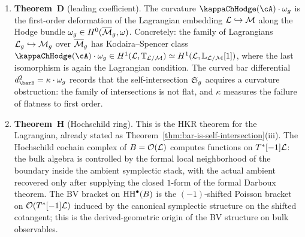 \begin{proposition}
\begin{enumerate}[label=\textup{(\Alph*)},leftmargin=2.2em]
\item \textbf{Theorem~D} \textup{(}leading coefficient\textup{)}.
 The curvature $\kappaChHodge(\cA) \cdot \omega_g$ is the first-order
 deformation of the Lagrangian embedding
 $\mathcal L \hookrightarrow \mathcal M$ along the Hodge bundle
 $\omega_g \in H^0(\overline{\mathcal M}_g, \omega)$. Concretely:
 the family of Lagrangians
 $\mathcal L_g \hookrightarrow \mathcal M_g$ over $\overline{\mathcal M}_g$ has
 Kodaira--Spencer class $\kappaChHodge(\cA) \cdot \omega_g
 \in H^1(\cL, \mathbb{T}_{\cL/\cM}) \simeq
 H^1(\cL, \mathbb{L}_{\cL/\cM}[1])$,
 where the last isomorphism is again the Lagrangian condition.
 The curved bar differential
 $d_{\barB}^2 = \kappa \cdot \omega_g$ records that the
 self-intersection $\mathfrak{S}_g$ acquires a curvature obstruction:
 the family of intersections is not flat, and $\kappa$ measures
 the failure of flatness to first order.

\item \textbf{Theorem~H} \textup{(}Hochschild ring\textup{)}.
 This is the HKR theorem for the Lagrangian, already stated as
 Theorem~\ref{thm:bar-is-self-intersection}(iii). The
 Hochschild cochain complex of $B = \mathcal O(\mathcal L)$ computes functions
 on $T^*[-1]\mathcal L$: the bulk algebra is controlled by the
 formal local neighborhood of the boundary inside the ambient
 symplectic stack, with the actual ambient recovered only after
 supplying the closed $1$-form of the formal Darboux theorem.
 The BV bracket on $\operatorname{HH}^\bullet(B)$ is the
 $(-1)$-shifted Poisson bracket on $\mathcal O(T^*[-1]\mathcal L)$ induced by
 the canonical symplectic structure on the shifted
 cotangent; this is the derived-geometric origin of the BV
 structure on bulk observables.
\end{enumerate}
\end{proposition}

